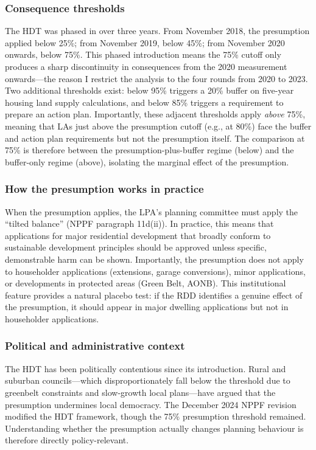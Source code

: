 \documentclass[12pt]{article}
\begin{document}
\subsubsection*{Consequence thresholds} The HDT was phased in over three years. From November 2018, the presumption applied below 25\%; from November 2019, below 45\%; from November 2020 onwards, below 75\%. This phased introduction means the 75\% cutoff only produces a sharp discontinuity in consequences from the 2020 measurement onwards---the reason I restrict the analysis to the four rounds from 2020 to 2023. Two additional thresholds exist: below 95\% triggers a 20\% buffer on five-year housing land supply calculations, and below 85\% triggers a requirement to prepare an action plan. Importantly, these adjacent thresholds apply \emph{above} 75\%, meaning that LAs just above the presumption cutoff (e.g., at 80\%) face the buffer and action plan requirements but not the presumption itself. The comparison at 75\% is therefore between the presumption-plus-buffer regime (below) and the buffer-only regime (above), isolating the marginal effect of the presumption.

\subsubsection*{How the presumption works in practice} When the presumption applies, the LPA's planning committee must apply the ``tilted balance'' (NPPF paragraph 11d(ii)). In practice, this means that applications for major residential development that broadly conform to sustainable development principles should be approved unless specific, demonstrable harm can be shown. Importantly, the presumption does not apply to householder applications (extensions, garage conversions), minor applications, or developments in protected areas (Green Belt, AONB). This institutional feature provides a natural placebo test: if the RDD identifies a genuine effect of the presumption, it should appear in major dwelling applications but not in householder applications.

\subsubsection*{Political and administrative context} The HDT has been politically contentious since its introduction. Rural and suburban councils---which disproportionately fall below the threshold due to greenbelt constraints and slow-growth local plans---have argued that the presumption undermines local democracy. The December 2024 NPPF revision modified the HDT framework, though the 75\% presumption threshold remained. Understanding whether the presumption actually changes planning behaviour is therefore directly policy-relevant.
\end{document}

